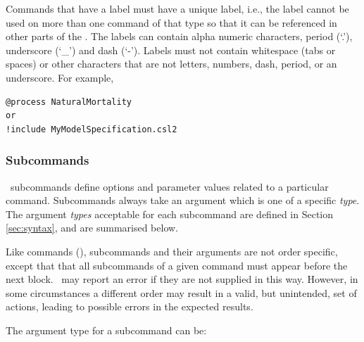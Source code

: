 Commands that have a label must have a unique label, i.e., the label cannot be used on more than one command of that type so that it can be referenced in other parts of the \config. The labels can contain alpha numeric characters, period (`.'), underscore (`\_') and dash (`-'). Labels must not contain whitespace (tabs or spaces) or other characters that are not letters, numbers, dash, period, or an underscore. For example,

{\small{\begin{verbatim}
@process NaturalMortality
or
!include MyModelSpecification.csl2
		\end{verbatim}}}

\subsubsection{Subcommands}

\CNAME~subcommands define options and parameter values related to a particular command. Subcommands always take an argument which is one of a specific \emph{type}. The argument \emph{types} acceptable for each subcommand are defined in Section \ref{sec:syntax}, and are summarised below.

Like commands (), subcommands and their arguments are not order specific, except that that all subcommands of a given command must appear before the next  block. \CNAME~may report an error if they are not supplied in this way. However, in some circumstances a different order may result in a valid, but unintended, set of actions, leading to possible errors in the expected results.

The argument type for a subcommand can be:

